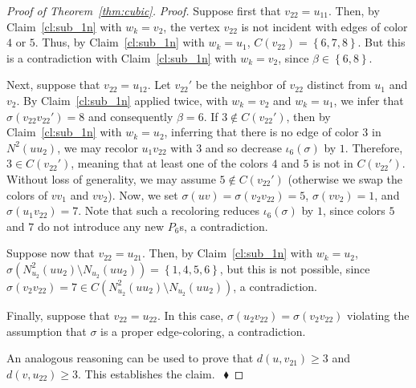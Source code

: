 \documentclass[12pt,a4paper]{article}
\newcommand{\set}[1]{\ensuremath{\left\{#1 \right\}}}
\newenvironment{proofclaim}[1][]%
    {\noindent \emph{Proof.} {}{#1}{}}{$~$\hfill $~\blacklozenge$ \vspace{0.2cm}}
\begin{document}
\begin{proof}[Proof of Theorem~\ref{thm:cubic}]
\begin{proofclaim}
		Suppose first that $v_{22} = u_{11}$.
		Then, by Claim~\ref{cl:sub_1n} with $w_k = v_2$, the vertex $v_{22}$ is not incident with edges of color $4$ or $5$.
		Thus, by Claim~\ref{cl:sub_1n} with $w_k = u_1$, $C(v_{22}) = \set{6,7,8}$.
		But this is a contradiction with Claim~\ref{cl:sub_1n} with $w_k = v_2$, since $\beta \in \set{6,8}$.
		
		Next, suppose that $v_{22} = u_{12}$.
		Let $v_{22}'$ be the neighbor of $v_{22}$ distinct from $u_1$ and $v_2$.
		By Claim~\ref{cl:sub_1n} applied twice, with $w_k = v_2$ and $w_k = u_1$, we infer that $\sigma(v_{22}v_{22}') = 8$ 
		and consequently $\beta = 6$.
		If $3 \notin C(v_{22}')$, then by Claim~\ref{cl:sub_1n} with $w_k = u_2$,
		inferring that there is no edge of color $3$ in $N^2(uu_2)$,
		we may recolor $u_1v_{22}$ with $3$ and so decrease $\iota_6(\sigma)$ by $1$. 
		Therefore, $3 \in C(v_{22}')$, meaning that at least one of the colors $4$ and $5$ is not in $C(v_{22}')$.
		Without loss of generality, we may assume $5 \notin C(v_{22}')$ (otherwise we swap the colors of $vv_1$ and $vv_2$).
		Now, we set $\sigma(uv) = \sigma(v_2v_{22}) = 5$, $\sigma(vv_2) = 1$, and $\sigma(u_1v_{22}) = 7$.
		Note that such a recoloring reduces $\iota_6(\sigma)$ by $1$, since colors $5$ and $7$ do not introduce 
		any new $P_6$s, a contradiction.
		
		Suppose now that $v_{22} = u_{21}$.
		Then, by Claim~\ref{cl:sub_1n} with $w_k = u_2$, $\sigma(N_{u_2}^2(uu_2) \setminus N_{u_2}(uu_2)) = \set{1,4,5,6}$,
		but this is not possible, since $\sigma(v_2v_{22}) = 7 \in C(N_{u_2}^2(uu_2) \setminus N_{u_2}(uu_2))$, a contradiction.
		
		Finally, suppose that $v_{22} = u_{22}$. 
		In this case, $\sigma(u_2v_{22}) = \sigma(v_2v_{22})$ violating the assumption that $\sigma$ is a proper edge-coloring, a contradiction.
		
		An analogous reasoning can be used to prove that $d(u,v_{21}) \ge 3$ and $d(v,u_{22}) \ge 3$.
		This establishes the claim.		
	\end{proofclaim}
	

\end{proof}
\end{document}
